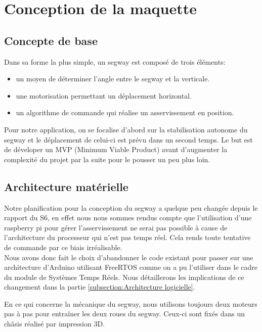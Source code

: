 \documentclass[oneside,a4paper,12pt]{article}
\begin{document}
	\section{Conception de la maquette}
	
	\subsection{Concepte de base}
	
	Dans sa forme la plus simple, un segway est composé de trois éléments:
	
	\begin{itemize}
		\item un moyen de déterminer l'angle entre le segway et la verticale.
		\item une motorisation permettant un déplacement horizontal.
		\item un algorithme de commande qui réalise un asservissement en position. 
	\end{itemize}

	Pour notre application, on se focalise d'abord sur la stabilisation autonome du segway et le déplacement de celui-ci est prévu dans un second temps. Le but est de déveloper un MVP (Minimum Viable Product) avant d'augmenter la complexité du projet par la suite pour le pousser un peu plus loin.
	
	\subsection{Architecture matérielle}
	\label{Architecture matérielle}
	
	Notre planification pour la conception du segway a quelque peu changée depuis le rapport du S6, en effet nous nous sommes rendus compte que l'utilisation d'une raspberry pi pour gérer l'asservissement ne serai pas possible à cause de l'architecture du processeur qui n'est pas temps réel. Cela rends toute tentative de commande par ce biais irréalisable.\\
	Nous avons donc fait le choix d'abandonner le code existant pour passer sur une architecture d'Arduino utilisant FreeRTOS comme on a pu l'utiliser dans le cadre du module de Systèmes Temps Réels. Nous détaillerons les implications de ce changement dans la partie  \ref{subsection:Architecture logicielle}.
	
	En ce qui concerne la mécanique du segway, nous utilisons toujours deux moteurs pas à pas pour entraîner les deux roues du segway. Ceux-ci sont fixés dans un châsis réalisé par impression 3D.
	
\end{document}
